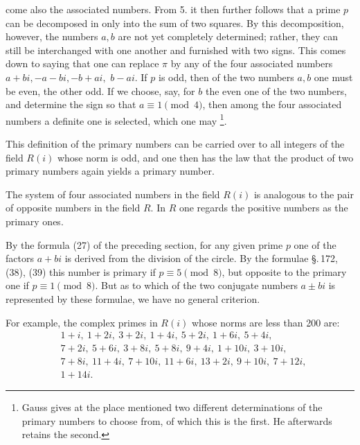 come also the associated numbers. From 5. it then further follows
that a prime $p$ can be decomposed in only  into the sum of two
squares. By this decomposition, however, the numbers $a, b$ are
not yet completely determined; rather, they can still be interchanged
with one another and furnished with two signs.
This comes down to saying that one can replace $\pi$ by
any of the four associated numbers $a+bi, -a-bi, -b+ai,$
$b-ai$. If $p$ is odd, then of the two
numbers $a, b$ one must be even, the other odd. If we choose,
say, for $b$ the even one of the two numbers, and determine
the sign so that $a \equiv 1 \pmod{4}$, then among the
four associated numbers a definite one is selected, which one may
\footnote{Gauss gives at the place mentioned two different determinations
 of the primary numbers to choose from, of which this is the first.
He afterwards retains the second.}.

This definition of the primary numbers can be carried over to all
integers of the field $R(i)$ whose norm is
odd, and one then has the law that the product
of two primary numbers again yields a primary number.

The system of four associated numbers in the field $R(i)$ is
analogous to the pair of opposite numbers in the field $R$. In $R$
one regards the positive numbers as the primary ones.

By the formula (27) of the preceding section, for
any given prime $p$ one of the factors $a+bi$ is derived
from the division of the circle. By the formulae \S.\,172, (38), (39)
this number is primary if $p \equiv 5 \pmod{8}$, but opposite to
the primary one if $p \equiv 1 \pmod{8}$. But as to
which of the two conjugate numbers $a \pm bi$ is represented by these
formulae, we have no general criterion.

For example, the complex primes in $R(i)$ whose
norms are less than 200 are:
\[
\begin{aligned}
&1+i,\ 1+2i,\ 3+2i,\ 1+4i,\ 5+2i,\ 1+6i,\ 5+4i,\\
&7+2i,\ 5+6i,\ 3+8i,\ 5+8i,\ 9+4i,\ 1+10i,\ 3+10i,\\
&7+8i,\ 11+4i,\ 7+10i,\ 11+6i,\ 13+2i,\ 9+10i,\ 7+12i,\\
&1+14i.
\end{aligned}
\]
